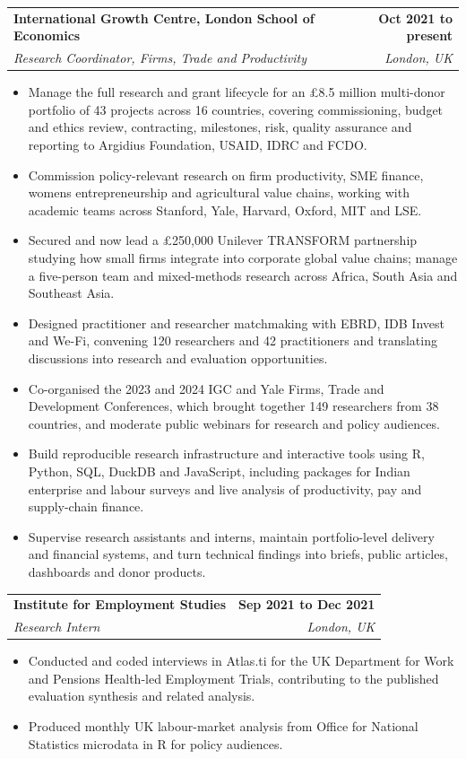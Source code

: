 \documentclass[10pt,a4paper]{article}
\makeatletter
\newcommand{\entry}[4]{%
  \begin{tabularx}{\textwidth}{@{}X r@{}}
    \textbf{#1} & \textbf{#2} \\
    \textit{#3} & \textit{#4}
  \end{tabularx}\vspace{-2pt}
}
\makeatother
\begin{document}
\entry{International Growth Centre, London School of Economics}{Oct 2021 to present}{Research Coordinator, Firms, Trade and Productivity}{London, UK}
\begin{itemize}
  \item Manage the full research and grant lifecycle for an \pounds8.5 million multi-donor portfolio of 43 projects across 16 countries, covering commissioning, budget and ethics review, contracting, milestones, risk, quality assurance and reporting to Argidius Foundation, USAID, IDRC and FCDO.
  \item Commission policy-relevant research on firm productivity, SME finance, women\textquotesingle s entrepreneurship and agricultural value chains, working with academic teams across Stanford, Yale, Harvard, Oxford, MIT and LSE.
  \item Secured and now lead a \pounds250,000 Unilever TRANSFORM partnership studying how small firms integrate into corporate global value chains; manage a five-person team and mixed-methods research across Africa, South Asia and Southeast Asia.
  \item Designed practitioner and researcher matchmaking with EBRD, IDB Invest and We-Fi, convening 120 researchers and 42 practitioners and translating discussions into research and evaluation opportunities.
  \item Co-organised the 2023 and 2024 IGC and Yale Firms, Trade and Development Conferences, which brought together 149 researchers from 38 countries, and moderate public webinars for research and policy audiences.
  \item Build reproducible research infrastructure and interactive tools using R, Python, SQL, DuckDB and JavaScript, including packages for Indian enterprise and labour surveys and live analysis of productivity, pay and supply-chain finance.
  \item Supervise research assistants and interns, maintain portfolio-level delivery and financial systems, and turn technical findings into briefs, public articles, dashboards and donor products.
\end{itemize}

\entry{Institute for Employment Studies}{Sep 2021 to Dec 2021}{Research Intern}{London, UK}
\begin{itemize}
  \item Conducted and coded interviews in Atlas.ti for the UK Department for Work and Pensions Health-led Employment Trials, contributing to the published evaluation synthesis and related analysis.
  \item Produced monthly UK labour-market analysis from Office for National Statistics microdata in R for policy audiences.
\end{itemize}
\end{document}
